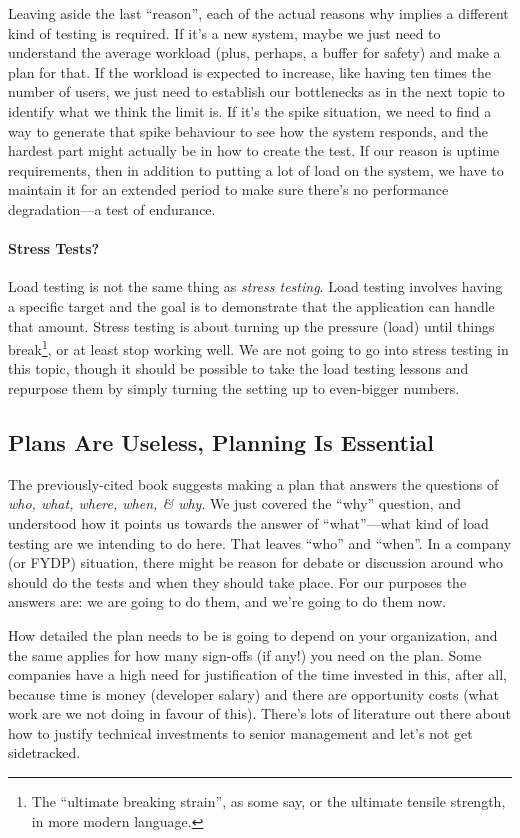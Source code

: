 Leaving aside the last ``reason'', each of the actual reasons why implies a different kind of testing is required. If it's a new system, maybe we just need to understand the average workload (plus, perhaps, a buffer for safety) and make a plan for that. If the workload is expected to increase, like having ten times the number of users, we just need to establish our bottlenecks as in the next topic to identify what we think the limit is. If it's the spike situation, we need to find a way to generate that spike behaviour to see how the system responds, and the hardest part might actually be in how to create the test. If our reason is uptime requirements, then in addition to putting a lot of load on the system, we have to maintain it for an extended period to make sure there's no performance degradation---a test of endurance.

\paragraph{Stress Tests?} Load testing is not the same thing as \textit{stress testing}. Load testing involves having a specific target and the goal is to demonstrate that the application can handle that amount. Stress testing is about turning up the pressure (load) until things break\footnote{The ``ultimate breaking strain'', as some say, or the ultimate tensile strength, in more modern language.}, or at least stop working well. We are not going to go into stress testing in this topic, though it should be possible to take the load testing lessons and repurpose them by simply turning the setting up to even-bigger numbers.

\subsection*{Plans Are Useless, Planning Is Essential} The previously-cited book suggests making a plan that answers the questions of \textit{who, what, where, when, \& why}. We just covered the ``why'' question, and understood how it points us towards the answer of ``what''---what kind of load testing are we intending to do here. That leaves ``who'' and ``when''. In a company (or FYDP) situation, there might be reason for debate or discussion around who should do the tests and when they should take place. For our purposes the answers are: we are going to do them, and we're going to do them now.

How detailed the plan needs to be is going to depend on your organization, and the same applies for how many sign-offs (if any!) you need on the plan. Some companies have a high need for justification of the time invested in this, after all, because time is money (developer salary) and there are opportunity costs (what work are we not doing in favour of this). There's lots of literature out there about how to justify technical investments to senior management and let's not get sidetracked.

